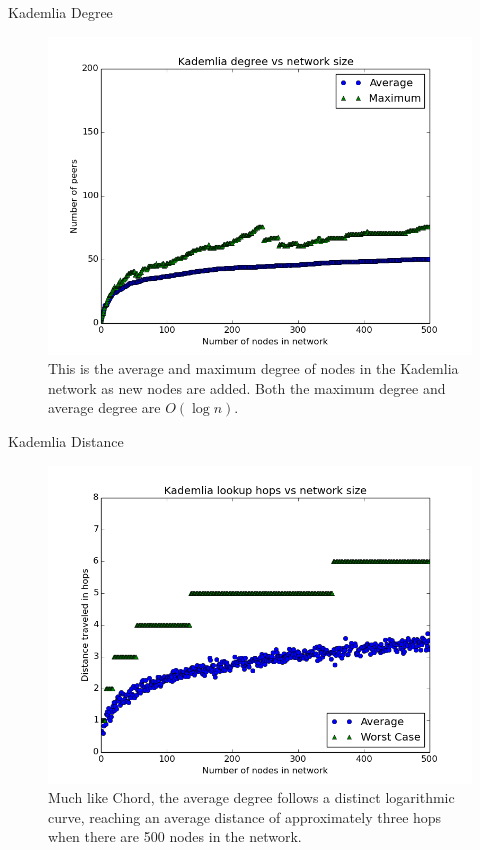 \documentclass[11pt]{beamer}
\begin{document}
\begin{frame}{Kademlia Degree}
\begin{figure}
	\centering
	\includegraphics[width=0.7\linewidth]{figs/KademliaDegree}
	\caption[Degree of nodes in Kademlia]{This is the average and maximum degree of nodes in the Kademlia network as new nodes are added.  Both the maximum degree and average degree are $O(\log n)$.}
	\label{fig:KademliaDegree}
\end{figure}
\end{frame}

\begin{frame}{Kademlia Distance}
\begin{figure}
	\centering
	\includegraphics[width=0.7\linewidth]{figs/KademliaDistance}
	\caption[Kademlia hops]{Much like Chord, the average degree follows a distinct logarithmic curve, reaching an average distance of approximately three hops when there are 500 nodes in the network.}
	\label{fig:KademliaDistance}
\end{figure}
\end{frame}
\end{document}
